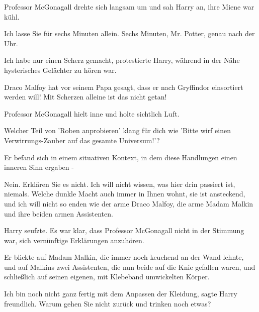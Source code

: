 Professor McGonagall drehte sich langsam um und sah Harry an, ihre Miene war
kühl.

\glqq{}Ich lasse Sie für sechs Minuten allein. Sechs Minuten, Mr. Potter, genau
nach der Uhr.\grqq{}

\glqq{}Ich habe nur einen Scherz gemacht\grqq{}, protestierte Harry, während in
der Nähe hysterisches Gelächter zu hören war.

\glqq{}Draco Malfoy hat vor seinem Papa gesagt, dass er nach Gryffindor
einsortiert werden will! Mit Scherzen alleine ist das nicht getan!\grqq{}

Professor McGonagall hielt inne und holte sichtlich Luft.

\glqq{}Welcher Teil von 'Roben anprobieren' klang für dich wie 'Bitte wirf einen
Verwirrungs-Zauber auf das gesamte Universum!'?\grqq{}

\glqq{}Er befand sich in einem situativen Kontext, in dem diese Handlungen einen
inneren Sinn ergaben -\grqq{}

\glqq{}Nein. Erklären Sie es nicht. Ich will nicht wissen, was hier drin passiert
ist, niemals. Welche dunkle Macht auch immer in Ihnen wohnt, sie ist ansteckend,
und ich will nicht so enden wie der arme Draco Malfoy, die arme Madam Malkin und
ihre beiden armen Assistenten.\grqq{}

Harry seufzte. Es war klar, dass Professor McGonagall nicht in der Stimmung war,
sich vernünftige Erklärungen anzuhören.

Er blickte auf Madam Malkin, die immer noch keuchend an der Wand lehnte, und auf
Malkins zwei Assistenten, die nun beide auf die Knie gefallen waren, und
schließlich auf seinen eigenen, mit Klebeband umwickelten Körper.

\glqq{}Ich bin noch nicht ganz fertig mit dem Anpassen der Kleidung\grqq{}, sagte
Harry freundlich. \glqq{}Warum gehen Sie nicht zurück und trinken noch
etwas?\grqq{}